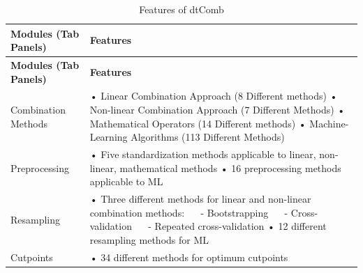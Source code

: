 \begin{longtable}[]{@{}
  >{\raggedright\arraybackslash}p{}
  >{\raggedright\arraybackslash}p{}@{}}
\caption{\label{tab:dtComb-features} Features of dtComb}\tabularnewline
\toprule\noalign{}
\begin{minipage}[b]{\linewidth}\raggedright
\textbf{Modules (Tab Panels)}
\end{minipage} & \begin{minipage}[b]{\linewidth}\raggedright
\textbf{Features}
\end{minipage} \\
\midrule\noalign{}
\endfirsthead
\toprule\noalign{}
\begin{minipage}[b]{\linewidth}\raggedright
\textbf{Modules (Tab Panels)}
\end{minipage} & \begin{minipage}[b]{\linewidth}\raggedright
\textbf{Features}
\end{minipage} \\
\midrule\noalign{}
\endhead
\bottomrule\noalign{}
\endlastfoot
Combination Methods & • Linear Combination Approach (8 Different methods) \newline  • Non-linear Combination Approach (7 Different Methods) \newline  • Mathematical Operators (14 Different methods) \newline  • Machine-Learning Algorithms (113 Different Methods) \citep{kuhn2008building} \\
Preprocessing & • Five standardization methods applicable to linear, non-linear, mathematical methods \newline  • 16 preprocessing methods applicable to ML \citep{kuhn2008building} \\
Resampling & • Three different methods for linear and non-linear combination methods: \newline  \(\quad\) \hspace*{0.3cm} - Bootstrapping \newline \(\quad\) \hspace*{0.3cm} - Cross-validation \newline  \(\quad\) \hspace*{0.3cm} - Repeated cross-validation \newline  • 12 different resampling methods for ML \citep{kuhn2008building} \\
Cutpoints & • 34 different methods for optimum cutpoints \citep{yin2014optimal} \\
\end{longtable}

